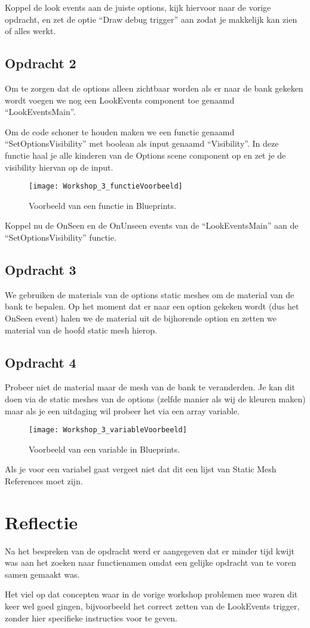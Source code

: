 Koppel de look events aan de juiste options, kijk hiervoor naar de vorige opdracht, en zet de optie  “Draw debug trigger” aan zodat je makkelijk kan zien of alles werkt.

\subsection{Opdracht 2}
Om te zorgen dat de options alleen zichtbaar worden als er naar de bank gekeken wordt voegen we nog een LookEvents component toe genaamd “LookEventsMain”. 

Om de code schoner te houden maken we een functie genaamd “SetOptionsVisibility” met boolean als input genaamd “Visibility”. In deze functie haal je alle kinderen van de Options scene component op en zet je de visibility hiervan op de input.

\begin{figure}[!ht]
  \centering
    \texttt{[image: Workshop\_3\_functieVoorbeeld]}
    \caption{Voorbeeld van een functie in Blueprints.}
\end{figure}

Koppel nu de OnSeen en de OnUnseen events van de “LookEventsMain” aan de “SetOptionsVisibility” functie.

\subsection{Opdracht 3}
We gebruiken de materials van de options static meshes om de material van de bank te bepalen. Op het moment dat er naar een option gekeken wordt (dus het OnSeen event) halen we de material uit de bijhorende option en zetten we material van de hoofd static mesh hierop.

\subsection{Opdracht 4}
Probeer niet de material maar de mesh van de bank te veranderden. Je kan dit doen via de static meshes van de options (zelfde manier als wij de kleuren maken) maar als je een uitdaging wil probeer het via een array variable.

\begin{figure}[!ht]
  \centering
    \texttt{[image: Workshop\_3\_variableVoorbeeld]}
    \caption{Voorbeeld van een variable in Blueprints.}
\end{figure}

Als je voor een variabel gaat vergeet niet dat dit een lijst van Static Mesh References moet zijn.

\section{Reflectie}
Na het bespreken van de opdracht werd er aangegeven dat er minder tijd kwijt was aan het zoeken naar functienamen omdat een gelijke opdracht van te voren samen gemaakt was. 

Het viel op dat concepten waar in de vorige workshop problemen mee waren dit keer wel goed gingen, bijvoorbeeld het correct zetten van de LookEvents trigger, zonder hier specifieke instructies voor te geven.